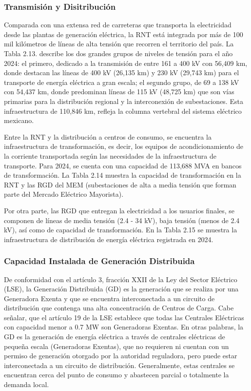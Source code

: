 \documentclass{sener2025}
\begin{document}
\subsubsection{Transmisión y Disitribución}

Comparada con una extensa red de carreteras que transporta la electricidad desde las plantas de generación eléctrica, la RNT está integrada por más de 100 mil kilómetros de líneas de alta tensión que recorren el territorio del país. La Tabla 2.13. describe los dos grandes grupos de niveles de tensión para el año 2024: el primero, dedicado a la transmisión de entre 161 a 400 kV con 56,409 km, donde destacan las líneas de 400 kV (26,135 km) y 230 kV (29,743 km) para el transporte de energía eléctrica a gran escala; el segundo grupo, de 69 a 138 kV con 54,437 km, donde predominan líneas de 115 kV (48,725 km) que son vías primarias para la distribución regional y la interconexión de subestaciones. Esta infraestructura de 110,846 km, refleja la columna vertebral del sistema eléctrico mexicano.

Entre la RNT y la distribución a centros de consumo, se encuentra la infraestructura de transformación, es decir, los equipos de acondicionamiento de la corriente transportada según las necesidades de la infraestructura de transporte. Para 2024, se cuenta con una capacidad de 113,688 MVA en bancos de transformación. La Tabla 2.14 muestra la capacidad de transformación en la RNT y las RGD del MEM (subestaciones de alta a media tensión que forman parte del Mercado Eléctrico Mayorista).

Por otra parte, las RGD que entregan la electricidad a los usuarios finales, se componen de líneas de media tensión (2.4 - 34 kV), baja tensión (menos de 2.4 kV), así como de capacidad de transformación. En la Tabla 2.15 se muestra la infraestructura de distribución de energía eléctrica registrada en 2024.


\subsubsection{Capacidad Instalada de Generación Distribuida}

De conformidad con el artículo 3, fracción XXII de la Ley del Sector Eléctrico (LSE), la Generación Distribuida (GD) es la generación que se realiza por una Generadora Exenta y que se encuentra interconectada a un circuito de distribución que contenga una alta concentración de Centros de Carga. Cabe señalar, que el artículo 19 de la LSE establece que todas las Centrales Eléctricas con capacidad menor a 0.7 MW son Generadoras Exentas. En otras palabras, la GD es la generación de energía eléctrica a través de centrales eléctricas de pequeña escala (Generadoras Exentas), que no requieren ni cuentan con un permiso de generación otorgado por la autoridad reguladora, pero puede estar interconectada a un circuito de distribución. Generalmente, estas centrales se encuentran cerca del punto de consumo y abastecen parcial o totalmente la demanda local.
\end{document}
